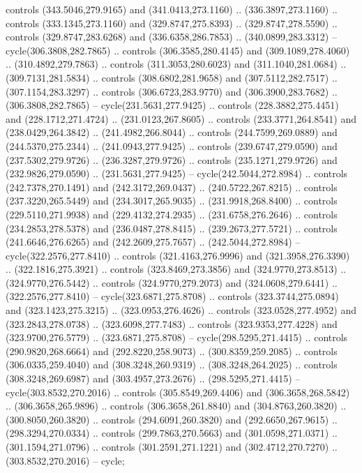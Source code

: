\begin{scope}[cm={{1.25,0.0,0.0,-1.25,(0.0,743.43331)}}]
    controls (343.5046,279.9165) and (341.0413,273.1160) .. (336.3897,273.1160) ..
    controls (333.1345,273.1160) and (329.8747,275.8393) .. (329.8747,278.5590) ..
    controls (329.8747,283.6268) and (336.6358,286.7853) .. (340.0899,283.3312) --
    cycle(306.3808,282.7865) .. controls (306.3585,280.4145) and
    (309.1089,278.4060) .. (310.4892,279.7863) .. controls (311.3053,280.6023) and
    (311.1040,281.0684) .. (309.7131,281.5834) .. controls (308.6802,281.9658) and
    (307.5112,282.7517) .. (307.1154,283.3297) .. controls (306.6723,283.9770) and
    (306.3900,283.7682) .. (306.3808,282.7865) -- cycle(231.5631,277.9425) ..
    controls (228.3882,275.4451) and (228.1712,271.4724) .. (231.0123,267.8605) ..
    controls (233.3771,264.8541) and (238.0429,264.3842) .. (241.4982,266.8044) ..
    controls (244.7599,269.0889) and (244.5370,275.2344) .. (241.0943,277.9425) ..
    controls (239.6747,279.0590) and (237.5302,279.9726) .. (236.3287,279.9726) ..
    controls (235.1271,279.9726) and (232.9826,279.0590) .. (231.5631,277.9425) --
    cycle(242.5044,272.8984) .. controls (242.7378,270.1491) and
    (242.3172,269.0437) .. (240.5722,267.8215) .. controls (237.3220,265.5449) and
    (234.3017,265.9035) .. (231.9918,268.8400) .. controls (229.5110,271.9938) and
    (229.4132,274.2935) .. (231.6758,276.2646) .. controls (234.2853,278.5378) and
    (236.0487,278.8415) .. (239.2673,277.5721) .. controls (241.6646,276.6265) and
    (242.2609,275.7657) .. (242.5044,272.8984) -- cycle(322.2576,277.8410) ..
    controls (321.4163,276.9996) and (321.3958,276.3390) .. (322.1816,275.3921) ..
    controls (323.8469,273.3856) and (324.9770,273.8513) .. (324.9770,276.5442) ..
    controls (324.9770,279.2073) and (324.0608,279.6441) .. (322.2576,277.8410) --
    cycle(323.6871,275.8708) .. controls (323.3744,275.0894) and
    (323.1423,275.3215) .. (323.0953,276.4626) .. controls (323.0528,277.4952) and
    (323.2843,278.0738) .. (323.6098,277.7483) .. controls (323.9353,277.4228) and
    (323.9700,276.5779) .. (323.6871,275.8708) -- cycle(298.5295,271.4415) ..
    controls (290.9820,268.6664) and (292.8220,258.9073) .. (300.8359,259.2085) ..
    controls (306.0335,259.4040) and (308.3248,260.9319) .. (308.3248,264.2025) ..
    controls (308.3248,269.6987) and (303.4957,273.2676) .. (298.5295,271.4415) --
    cycle(303.8532,270.2016) .. controls (305.8549,269.4406) and
    (306.3658,268.5842) .. (306.3658,265.9896) .. controls (306.3658,261.8840) and
    (304.8763,260.3820) .. (300.8050,260.3820) .. controls (294.6091,260.3820) and
    (292.6650,267.9615) .. (298.3294,270.0334) .. controls (299.7863,270.5663) and
    (301.0598,271.0371) .. (301.1594,271.0796) .. controls (301.2591,271.1221) and
    (302.4712,270.7270) .. (303.8532,270.2016) -- cycle;
\end{scope}
